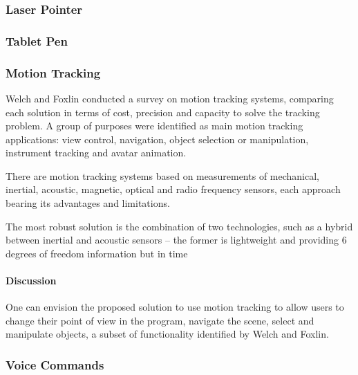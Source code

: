 

\subsubsection{Laser Pointer}

\subsubsection{Tablet Pen}


\subsubsection{Motion Tracking}

%
%


Welch and Foxlin \cite{MT-BULLET} conducted a survey on motion tracking systems, comparing
each solution in terms of cost, precision and capacity to solve the tracking problem.
A group of purposes were identified as main motion tracking applications:
view control, navigation, object selection or manipulation, instrument tracking and avatar animation.

There are motion tracking systems based on measurements of mechanical, inertial, acoustic, magnetic,
optical and radio frequency sensors, each approach bearing its advantages and limitations.

The most robust solution is the combination of two technologies, such as a hybrid between
inertial and acoustic sensors -- the former is lightweight and providing 6 degrees of freedom
information but in time


\paragraph{Discussion}

One can envision the proposed solution to use motion tracking to allow users to change their
point of view in the program, navigate the scene, select and manipulate objects, a subset
of functionality identified by Welch and Foxlin.



\subsubsection{Voice Commands}

